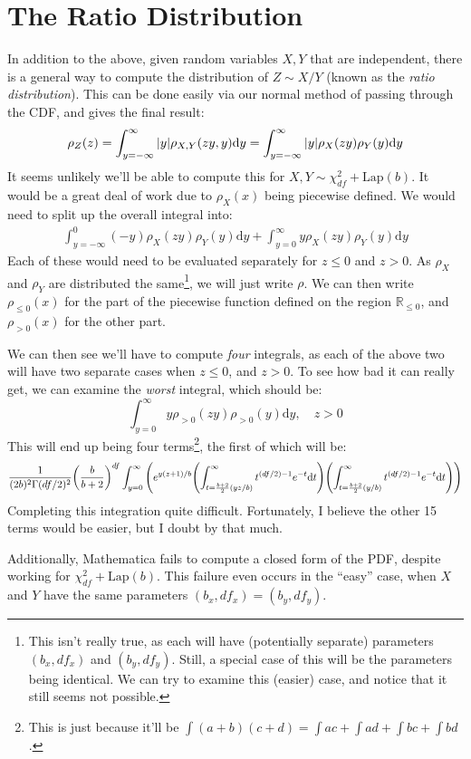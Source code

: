 \documentclass{article}
\begin{document}
\section{The Ratio Distribution}
In addition to the above, given random variables $X,Y$ that are independent, there is a general way to compute the distribution of $Z\sim X/Y$ (known as the \emph{ratio distribution}).
This can be done easily via our normal method of passing through the CDF, and gives the final result:
\begin{equation}
\rho_Z(z) = \int_{y = -\infty}^\infty\abs{y} \rho_{X,Y}(zy,y)\mathrm{ d}y = \int_{y = -\infty}^\infty \abs{y}\rho_X(zy)\rho_Y(y)\mathrm{ d}y
\end{equation}
It seems unlikely we'll be able to compute this for $X,Y\sim\chi^2_{df} + \text{Lap}(b)$.
It would be a great deal of work due to $\rho_X(x)$ being piecewise defined.
We would need to split up the overall integral into:
\begin{align*}
\int_{y =-\infty}^0 (-y)\rho_X(zy)\rho_Y(y)\mathrm{d}y + \int_{y =0}^\infty y\rho_X(zy)\rho_Y(y)\mathrm{d}y
\end{align*}
Each of these would need to be evaluated separately for $z \leq 0$ and $z > 0$.
As $\rho_X$ and $\rho_Y$ are distributed the same\footnote{This isn't really true, as each will have (potentially separate) parameters $(b_x,df_x)$ and $(b_y,df_y)$.
Still, a special case of this will be the parameters being identical.
We can try to examine this (easier) case, and notice that it still seems not possible.}, we will just write $\rho$.
We can then write $\rho_{\leq 0}(x)$ for the part of the piecewise function defined on the region $\mathbb{R}_{\leq 0}$, and $\rho_{>0}(x)$ for the other part.

We can then see we'll have to compute \emph{four} integrals, as each of the above two will have two separate cases when $z \leq 0$, and $z > 0$.
To see how bad it can really get, we can examine the \emph{worst} integral, which should be:
\begin{equation}
\int_{y = 0}^\infty y\rho_{>0}(zy)\rho_{>0}(y)\mathrm{d}y,\quad z > 0
\end{equation}
This will end up being four terms\footnote{This is just because it'll be $\int (a+b)(c+d) = \int ac + \int ad + \int bc + \int bd$.}, the first of which will be:
\begin{equation}
\frac{1}{(2b)^2\Gamma(df/2)^2}\pqty{\frac{b}{b+2}}^{df}\int_{y = 0}^\infty\pqty{e^{y(z+1)/b}\pqty{\int_{t = \frac{b+2}{2}(yz/b)}^{\infty}t^{(df/2)-1}e^{-t}\mathrm{d}t}\pqty{\int_{t = \frac{b+2}{2}(y/b)}^{\infty}t^{(df/2)-1}e^{-t}\mathrm{d}t}}
\end{equation}
Completing this integration quite difficult.
Fortunately, I believe the other 15 terms would be easier, but I doubt by that much.

Additionally, Mathematica fails to compute a closed form of the PDF, despite working for $\chi^2_{df}+\text{Lap}(b)$.
This failure even occurs in the ``easy'' case, when $X$ and $Y$ have the same parameters $(b_x,df_x) = (b_y,df_y)$.
\end{document}
